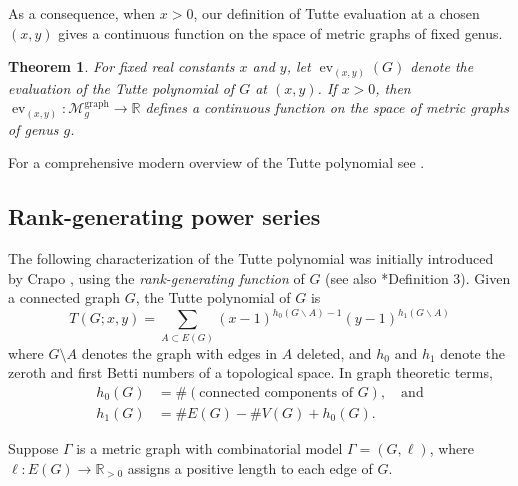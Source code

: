 \documentclass{amsart}
\newtheorem{thm}{Theorem}
\theoremstyle{definition}
\newcommand{\RR}{\mathbb{R}}
\newcommand{\RRpos}{\RR_{>0}}
\DeclareMathOperator{\ev}{ev}
\newcommand{\Mgraphg}{\mathcal M_g^{\mathrm{graph}}}
\begin{document}
As a consequence, when $x > 0$, our definition of Tutte evaluation at a chosen $(x, y)$ gives a continuous function on the space of metric graphs of fixed genus.
\begin{thm}
	For fixed real constants $x$ and $y$, let $\ev_{(x, y)}(G)$ denote the evaluation of the Tutte polynomial of $G$ at $(x, y)$.
	If $x > 0$, then $\ev_{(x, y)}: \Mgraphg \to \RR$ defines a continuous function on the space of metric graphs of genus $g$.
\end{thm}

For a comprehensive modern overview of the Tutte polynomial see \cites{BO, EMM}.

\subsection{Rank-generating power series}
The following characterization of the Tutte polynomial was initially introduced by Crapo \cite{Cra}, 
using the  {\em rank-generating function} of $G$
(see also \cite{EMM}*{Definition 3}).
Given a connected graph $G $, 
the Tutte polynomial of $G$ is 
\begin{equation}
\label{eq:tutte-graph}
T(G; x,y) = \sum_{A \subset E(G)} (x-1)^{h_0(G\backslash A) - 1}(y-1)^{h_1(G\backslash A)}
\end{equation}
where $G\setminus A$ denotes the graph with edges in $A$ deleted,
and $h_0$ and $h_1$ denote the zeroth and first Betti numbers of 
a topological space.
In graph theoretic terms,
\begin{align*}
h_0(G) &= \#(\text{connected components of }G), \quad\text{and}\\
h_1(G) &= \# E(G) - \# V(G) + h_0(G) .
\end{align*}


Suppose $\Gamma$ is a metric graph with combinatorial model $\Gamma = (G,\ell)$,
where $\ell : E(G) \to \RRpos$ assigns a positive length to each edge of $G$.
\end{document}
